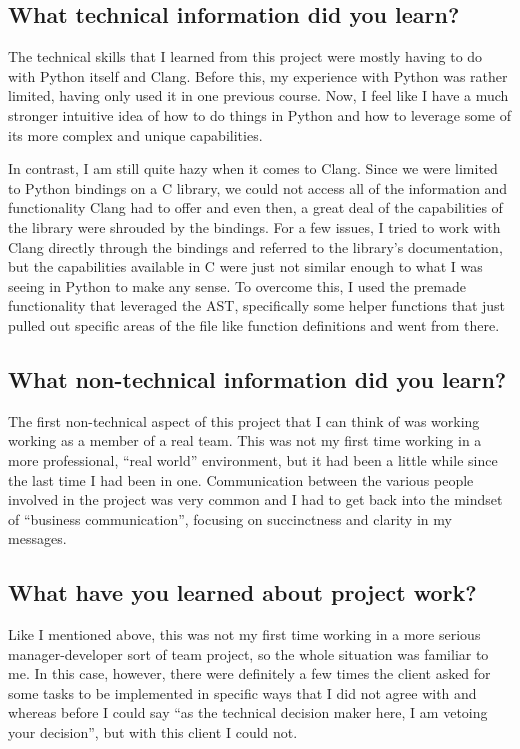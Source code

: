 \documentclass[11pt]{scrreprt}
\begin{document}
\subsection{What technical information did you learn?}

The technical skills that I learned from this project were mostly having to do with Python itself and Clang.
Before this, my experience with Python was rather limited, having only used it in one previous course.
Now, I feel like I have a much stronger intuitive idea of how to do things in Python and how to leverage some of its more complex and unique capabilities.

In contrast, I am still quite hazy when it comes to Clang.
Since we were limited to Python bindings on a C library, we could not access all of the information and functionality Clang had to offer and even then, a great deal of the capabilities of the library were shrouded by the bindings.
For a few issues, I tried to work with Clang directly through the bindings and referred to the library's documentation, but the capabilities available in C were just not similar enough to what I was seeing in Python to make any sense.
To overcome this, I used the premade functionality that leveraged the AST, specifically some helper functions that just pulled out specific areas of the file like function definitions and went from there.

\subsection{What non-technical information did you learn?}

The first non-technical aspect of this project that I can think of was working working as a member of a real team.
This was not my first time working in a more professional, ``real world'' environment, but it had been a little while since the last time I had been in one.
Communication between the various people involved in the project was very common and I had to get back into the mindset of ``business communication'', focusing on succinctness and clarity in my messages.

\subsection{What have you learned about project work?}

Like I mentioned above, this was not my first time working in a more serious manager-developer sort of team project, so the whole situation was familiar to me.
In this case, however, there were definitely a few times the client asked for some tasks to be implemented in specific ways that I did not agree with and whereas before I could say ``as the technical decision maker here, I am vetoing your decision'', but with this client I could not.
\end{document}
